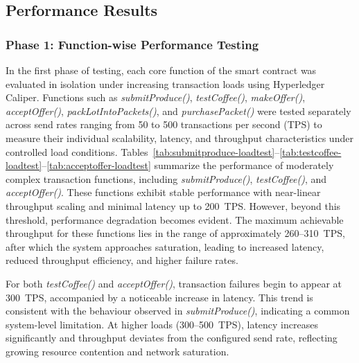 \documentclass[12pt]{article}
\begin{document}
	
	
	\subsection{Performance Results}
	
	\subsubsection{Phase 1: Function-wise Performance Testing}
	
	In the first phase of testing, each core function of the smart contract was evaluated in isolation under increasing transaction loads using Hyperledger Caliper. Functions such as \textit{submitProduce()}, \textit{testCoffee()}, \textit{makeOffer()}, \textit{acceptOffer()}, \textit{packLotIntoPackets()}, and \textit{purchasePacket()} were tested separately across send rates ranging from 50 to 500 transactions per second (TPS) to measure their individual scalability, latency, and throughput characteristics under controlled load conditions.
	Tables~\ref{tab:submitproduce-loadtest}--\ref{tab:testcoffee-loadtest}--\ref{tab:acceptoffer-loadtest} summarize the performance of moderately complex transaction functions, including \textit{submitProduce()}, \textit{testCoffee()}, and \textit{acceptOffer()}. These functions exhibit stable performance with near-linear throughput scaling and minimal latency up to 200~TPS. However, beyond this threshold, performance degradation becomes evident. The maximum achievable throughput for these functions lies in the range of approximately 260--310~TPS, after which the system approaches saturation, leading to increased latency, reduced throughput efficiency, and higher failure rates.
	
	For both \textit{testCoffee()} and \textit{acceptOffer()}, transaction failures begin to appear at 300~TPS, accompanied by a noticeable increase in latency. This trend is consistent with the behaviour observed in \textit{submitProduce()}, indicating a common system-level limitation. At higher loads (300--500~TPS), latency increases significantly and throughput deviates from the configured send rate, reflecting growing resource contention and network saturation.
	
	
	
	
	
\end{document}
